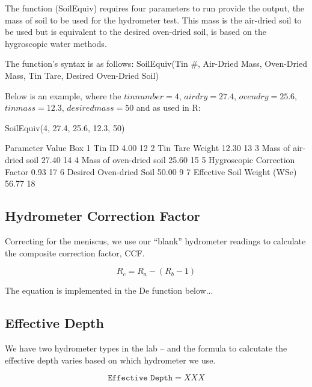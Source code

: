 The function (SoilEquiv) requires four parameters to run provide the output, the mass of soil to be used for the hydrometer test. This mass is the air-dried soil to be used but is equivalent to the desired oven-dried soil, is based on the hygroscopic water methods. 

The function's syntax is as follows: SoilEquiv(Tin \#, Air-Dried Mass, Oven-Dried Mass, Tin Tare, Desired Oven-Dried Soil)

Below is an example, where the $tin number = 4$, $airdry = 27.4$, $ovendry = 25.6$, $tinmass = 12.3$, $desiredmass = 50$ and as used in R: 

\begin{Schunk}
\begin{Sinput}
 SoilEquiv(4, 27.4, 25.6, 12.3, 50)
\end{Sinput}
\begin{Soutput}
                      Parameter Value Box
1                        Tin ID  4.00  12
2               Tin Tare Weight 12.30  13
3        Mass of air-dried soil 27.40  14
4       Mass of oven-dried soil 25.60  15
5 Hygroscopic Correction Factor  0.93  17
6       Desired Oven-dried Soil 50.00   9
7   Effective Soil Weight (WSe) 56.77  18
\end{Soutput}
\end{Schunk}


\subsection{Hydrometer Correction Factor}

Correcting for the meniscus, we use our ``blank'' hydrometer readings to calculate the composite correction factor, CCF. 

\begin{equation}
R_c = R_a - (R_b - 1)
\end{equation}

The equation is implemented in the De function below...



\subsection{Effective Depth}

We have two hydrometer types in the lab -- and the formula to calcutate the effective depth varies based on which hydrometer we use. 

\begin{equation}
\texttt{Effective Depth} = XXX
\end{equation}


